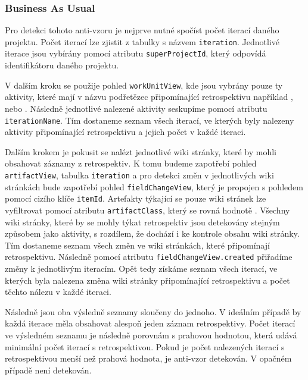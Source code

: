 \documentclass[czech,DP]{thesiskiv}
\begin{document}
\subsubsection{Business As Usual}
Pro detekci tohoto anti-vzoru je nejprve nutné spočíst počet iterací daného projektu. Počet iterací lze zjistit z tabulky s názvem \texttt{iteration}. Jednotlivé iterace jsou vybírány pomocí atributu \texttt{superProjectId}, který odpovídá identifikátoru daného projektu.
\par
V dalším kroku se použije pohled \texttt{workUnitView}, kde jsou vybrány pouze ty aktivity, které mají v názvu podřetězec připomínající retrospektivu například ,  nebo . Následně jednotlivé nalezené aktivity seskupíme pomocí atributu \texttt{iterationName}. Tím dostaneme seznam všech iterací, ve kterých byly nalezeny aktivity připomínající retrospektivu a jejich počet v každé iteraci.
\par
Dalším krokem je pokusit se nalézt jednotlivé wiki stránky, které by mohli obsahovat záznamy z retrospektiv. K tomu budeme zapotřebí pohled \texttt{artifactView}, tabulka \texttt{iteration} a pro detekci změn v jednotlivých wiki stránkách bude zapotřebí pohled \texttt{fieldChangeView}, který je propojen s pohledem pomocí cizího klíče \texttt{itemId}. Artefakty týkající se pouze wiki stránek lze vyfiltrovat pomocí atributu \texttt{artifactClass}, který se rovná hodnotě . Všechny wiki stránky, které by se mohly týkat retrospektiv jsou detekovány stejným způsobem jako aktivity, s rozdílem, že dochází i ke kontrole obsahu wiki stránky. Tím dostaneme seznam všech změn ve wiki stránkách, které připomínají retrospektivu. Následně pomocí atributu \texttt{fieldChangeView.created} přiřadíme změny k jednotlivým iteracím. Opět tedy získáme seznam všech iterací, ve kterých byla nalezena změna wiki stránky připomínající retrospektivu a počet těchto nálezu v každé iteraci. 
\par
Následně jsou oba výsledně seznamy sloučeny do jednoho. V ideálním případě by každá iterace měla obsahovat alespoň jeden záznam retrospektivy. Počet iterací ve výsledném seznamu je následně porovnám s prahovou hodnotou, která udává minimální počet iterací s retrospektivou. Pokud je počet nalezených iterací s retrospektivou menší než prahová hodnota, je anti-vzor detekován. V opačném případě není detekován.
\end{document}
